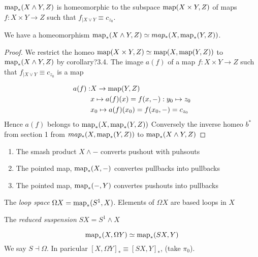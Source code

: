 \documentclass[main.tex]{subfiles}
\begin{document}
\begin{cor}
	\(\operatorname{map}_*(X \wedge Y, Z)\) is homeomorphic to the subspace \(\operatorname{map}(X \times Y, Z)\) of maps \(f: X \times Y \to Z\) such that \(f_{|X\vee Y} \equiv c_{z_0}\).
\end{cor}

\begin{thm}
	We have a homeomorphism \(\operatorname{map}_*(X \wedge Y, Z) \simeq map_*(X, \operatorname{map}_*(Y,Z))\).
\end{thm}

\begin{proof}
	We restrict the homeo \(\operatorname{map}(X \times Y, Z) \simeq \operatorname{map}(X, \operatorname{map}(Y,Z))\) to \(\operatorname{map}_*(X \wedge Y, Z)\) by corollary?3.4. The image \(a(f)\) of a map \(f: X \times Y \to Z\) such that \(f_{|X \vee Y} \equiv c_{z_0}\) is a map

\begin{align*}
		a(f): & X \to \map(Y,Z) \\
		 & x \mapsto a(f)(x) = f(x,-): y_0 \mapsto z_0 \\
		 & x_0 \mapsto a(f)(x_0) = f(x_0,-) = c_{z_0}

\end{align*}
	Hence \(a(f)\) belongs to \(\operatorname{map}_*(X, \operatorname{map}_*(Y,Z))\) Conversely the inverse homeo \(b^* \) from section 1 from \(map_*(X, \operatorname{map}_*(Y,Z))\) to \(\operatorname{map}_*(X \wedge Y, Z)\)
\end{proof}

\begin{cor}

\begin{enumerate}
		\item The smash product \(X \wedge -\) converts pushout with puhsouts
		\item The pointed map, \(\operatorname{map}_*(X, -)\) convertes pullbacks into pullbacks
		\item The pointed map, \(\operatorname{map}_*(-, Y)\) convertes pushouts into pullbacks

\end{enumerate}
\end{cor}

\begin{defn}
	The \emph{loop space} \(\Omega X = \operatorname{map}_*(S^1, X)\). Elements of \(\Omega X\) are based loops in \(X\)
\end{defn}

\begin{defn}
	The \emph{reduced suspension} \(SX = S^1 \wedge X\)
\end{defn}

\begin{prop}

\[
\operatorname{map}_*(X, \Omega Y) \simeq \operatorname{map}_*(SX,Y)
\]
	We say \(S \dashv \Omega\).
	In paricular \([X, \Omega Y]_* \equiv [SX, Y]_*\), (take \(\pi_0\)).
\end{prop}
\end{document}
